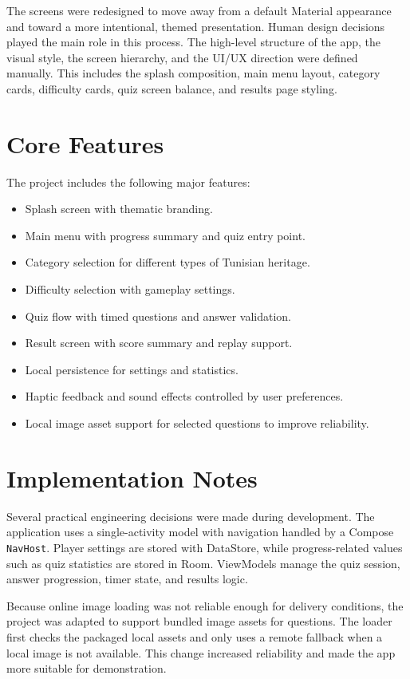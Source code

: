 \documentclass[12pt,a4paper]{article}
\begin{document}
The screens were redesigned to move away from a default Material appearance and toward a more intentional, themed presentation. Human design decisions played the main role in this process. The high-level structure of the app, the visual style, the screen hierarchy, and the UI/UX direction were defined manually. This includes the splash composition, main menu layout, category cards, difficulty cards, quiz screen balance, and results page styling.

\section{Core Features}
The project includes the following major features:
\begin{itemize}[leftmargin=1.5em]
    \item Splash screen with thematic branding.
    \item Main menu with progress summary and quiz entry point.
    \item Category selection for different types of Tunisian heritage.
    \item Difficulty selection with gameplay settings.
    \item Quiz flow with timed questions and answer validation.
    \item Result screen with score summary and replay support.
    \item Local persistence for settings and statistics.
    \item Haptic feedback and sound effects controlled by user preferences.
    \item Local image asset support for selected questions to improve reliability.
\end{itemize}

\section{Implementation Notes}
Several practical engineering decisions were made during development. The application uses a single-activity model with navigation handled by a Compose \texttt{NavHost}. Player settings are stored with DataStore, while progress-related values such as quiz statistics are stored in Room. ViewModels manage the quiz session, answer progression, timer state, and results logic.

Because online image loading was not reliable enough for delivery conditions, the project was adapted to support bundled image assets for questions. The loader first checks the packaged local assets and only uses a remote fallback when a local image is not available. This change increased reliability and made the app more suitable for demonstration.
\end{document}
